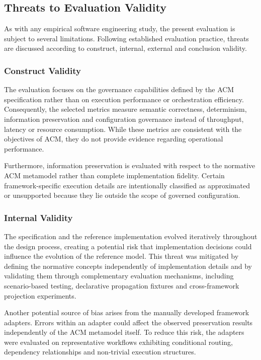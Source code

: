 \documentclass[10pt]{article}
\begin{document}
\subsection{Threats to Evaluation Validity}
\label{sec:threats_to_validity}

As with any empirical software engineering study, the present evaluation is subject to several limitations. Following established evaluation practice, threats are discussed according to construct, internal, external and conclusion validity.

\subsubsection{Construct Validity}

The evaluation focuses on the governance capabilities defined by the ACM specification rather than on execution performance or orchestration efficiency. Consequently, the selected metrics measure semantic correctness, determinism, information preservation and configuration governance instead of throughput, latency or resource consumption. While these metrics are consistent with the objectives of ACM, they do not provide evidence regarding operational performance.

Furthermore, information preservation is evaluated with respect to the normative ACM metamodel rather than complete implementation fidelity. Certain framework-specific execution details are intentionally classified as approximated or unsupported because they lie outside the scope of governed configuration.

\subsubsection{Internal Validity}

The specification and the reference implementation evolved iteratively throughout the design process, creating a potential risk that implementation decisions could influence the evolution of the reference model. This threat was mitigated by defining the normative concepts independently of implementation details and by validating them through complementary evaluation mechanisms, including scenario-based testing, declarative propagation fixtures and cross-framework projection experiments.

Another potential source of bias arises from the manually developed framework adapters. Errors within an adapter could affect the observed preservation results independently of the ACM metamodel itself. To reduce this risk, the adapters were evaluated on representative workflows exhibiting conditional routing, dependency relationships and non-trivial execution structures.
\end{document}
